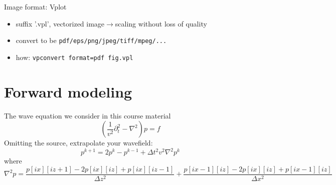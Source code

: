   
  Image format: Vplot
  \begin{itemize}
  \item suffix '.vpl', vectorized image$\rightarrow$scaling without loss of quality
  \item convert to be \texttt{pdf/eps/png/jpeg/tiff/mpeg/...}
  \item how: \texttt{vpconvert format=pdf fig.vpl}
  \end{itemize}
  



\section{Forward modeling}

The wave equation we consider in this course material
\begin{equation}\label{stateeq}
(\frac{1}{v^2}\partial_t^2 - \nabla^2 ) p=f
\end{equation}
Omitting the source, extrapolate your wavefield:
\begin{equation}\label{forwardupdate}
 p^{k+1}=2p^{k}-p^{k-1}+\Delta t^2 v^2 \nabla^2 p^k 
\end{equation}
where
\begin{equation}
 \nabla^2 p= \frac{p[ix][iz+1]-2p[ix][iz]+p[ix][iz-1]}{\Delta z^2} +\frac{p[ix-1][iz]-2p[ix][iz]+p[ix-1][iz]}{\Delta x^2}
\end{equation}


